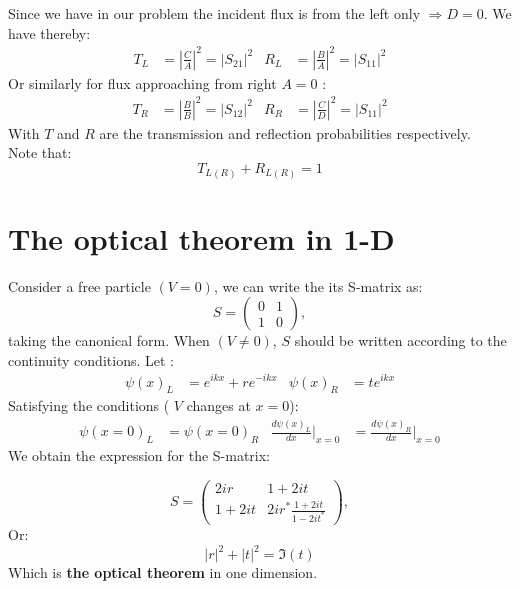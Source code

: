 Since we have in our problem the incident flux is from the left only $ \Rightarrow D=0$. We have thereby:
\begin{align*}
T_L&= \left| \frac{C}{A}\right|^2 = |S_{21}|^2  &  R_L&= \left| \frac{B}{A}\right|^2 = |S_{11}|^2
\end{align*}
Or similarly for flux approaching from right $ A=0$ :
\begin{align*}
T_R&= \left| \frac{B}{B}\right|^2 = |S_{12}|^2  &  R_R&= \left| \frac{C}{D}\right|^2 = |S_{11}|^2
\end{align*}
With $T$ and $R$ are the transmission and reflection probabilities respectively. \\ Note that:
\begin{equation}
T_{L (R)} +R_{L(R)} = 1
\end{equation}
\section{The optical theorem in 1-D}
Consider a free particle $ (V =0) $, we can write the its S-matrix as:
\begin{equation}
S = \begin{pmatrix}
0&1\\1&0
\end{pmatrix},
\end{equation}
taking the canonical form. When $ (V\neq 0)$, $S$ should be written according to the continuity conditions. Let :
\begin{align}
\psi(x)_L& = e^{i kx}+ r e^{-ikx}  & \psi(x)_R &= te^{ikx}
\end{align}
Satisfying the conditions ( $V$ changes at $ x=0$):
\begin{align}
\psi(x= 0)_L& = \psi(x=0)_R  &  \frac{d \psi(x)_L}{dx}| _{x=0} &= \frac{d \psi(x)_R}{dx}| _{x=0}
\end{align}
We obtain the expression for the S-matrix:

\begin{equation}
S = \begin{pmatrix}
2ir&1+2it\\1+2it&2ir^* \frac{1+2it}{1-2it^*}
\end{pmatrix},
\end{equation}
Or:
\begin{equation}
\boxed{|r|^2+|t|^2 = \Im(t)}
\end{equation}
Which is \textbf{the optical theorem } in one dimension.


\nocite{*} 